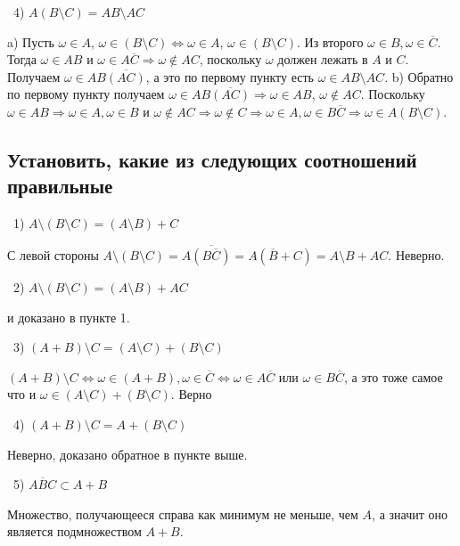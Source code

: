 \medskip
\noindent~4) $A \left( B \setminus C \right) = AB \setminus AC$

\noindent a) Пусть $\omega \in A$, $\omega \in \left( B \setminus C \right) \Leftrightarrow \omega
\in A $, $\omega \in \left( B \setminus C \right) $. Из второго $\omega \in B, \omega \in \overline{C}$.
Тогда $\omega \in AB$ и $\omega \in A\overline{C} \Rightarrow \omega \not\in AC$, поскольку
$\omega$ должен лежать в $A$ и $C$. Получаем $\omega \in AB \overline{\left( AC \right)} $, а это по первому пункту 
есть $\omega \in AB \setminus AC$. b) Обратно по первому пункту получаем $\omega \in AB \overline{\left( AC \right)}
 \Rightarrow \omega \in AB$, $\omega \not\in AC$. Поскольку $\omega \in AB \Rightarrow \omega \in A, 
 \omega \in B$ и $\omega \not\in AC \Rightarrow \omega \not\in C \Rightarrow \omega \in A, \omega
\in B\overline{C} \Rightarrow \omega \in A \left( B \setminus C \right)$. 

\subsection{Установить, какие из следующих соотношений правильные}
\noindent~1) $A \setminus \left( B \setminus C \right) = \left( A \setminus B \right) + C$

\noindent С левой стороны $A \setminus \left( B \setminus C \right) = A \overline{\left( 
B  \overline{C}\right) } = A \left( \overline{B} + C \right) = A \setminus B + A C$. Неверно.

\medskip
\noindent~2) $A \setminus \left( B \setminus C \right) = \left( A \setminus B \right) + AC$

 и доказано в пункте 1.

\medskip
\noindent~3) $\left( A + B \right) \setminus C = \left( A \setminus C \right) + \left( B \setminus C \right) $

\noindent $\left( A + B \right) \setminus C \Leftrightarrow \omega \in \left(A + B\right),
\omega \in \overline{C} \Leftrightarrow \omega \in A\overline{C} $ или $ \omega \in B\overline{C}$, 
а это тоже самое что и $\omega \in \left(A \setminus C\right) + \left(B \setminus C\right)$. Верно

\medskip
\noindent~4) $\left( A + B \right)  \setminus C = A + \left( B \setminus C \right) $

\noindent Неверно, доказано обратное в пункте выше.

\medskip
\noindent~5) $A\overline{B}C \subset A + B$

\noindent Множество, получающееся справа как минимум не меньше, чем $A$, а значит оно является 
подмножеством $A + B$.


